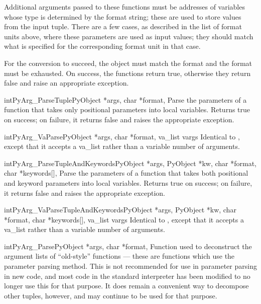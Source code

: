 Additional arguments passed to these functions must be addresses of
variables whose type is determined by the format string; these are
used to store values from the input tuple.  There are a few cases, as
described in the list of format units above, where these parameters
are used as input values; they should match what is specified for the
corresponding format unit in that case.

For the conversion to succeed, the  object must match the
format and the format must be exhausted.  On success, the
 functions return true, otherwise they
return false and raise an appropriate exception.

\begin{cfuncdesc}{int}{PyArg_ParseTuple}{PyObject *args, char *format,
                                         \moreargs}
  Parse the parameters of a function that takes only positional
  parameters into local variables.  Returns true on success; on
  failure, it returns false and raises the appropriate exception.
\end{cfuncdesc}

\begin{cfuncdesc}{int}{PyArg_VaParse}{PyObject *args, char *format,
                                         va_list vargs}
  Identical to , except that it accepts a
  va_list rather than a variable number of arguments.
\end{cfuncdesc}

\begin{cfuncdesc}{int}{PyArg_ParseTupleAndKeywords}{PyObject *args,
                       PyObject *kw, char *format, char *keywords[],
                       \moreargs}
  Parse the parameters of a function that takes both positional and
  keyword parameters into local variables.  Returns true on success;
  on failure, it returns false and raises the appropriate exception.
\end{cfuncdesc}

\begin{cfuncdesc}{int}{PyArg_VaParseTupleAndKeywords}{PyObject *args,
                       PyObject *kw, char *format, char *keywords[],
                       va_list vargs}
  Identical to , except that it
  accepts a va_list rather than a variable number of arguments.
\end{cfuncdesc}

\begin{cfuncdesc}{int}{PyArg_Parse}{PyObject *args, char *format,
                                    \moreargs}
  Function used to deconstruct the argument lists of ``old-style''
  functions --- these are functions which use the
   parameter parsing method.  This is not
  recommended for use in parameter parsing in new code, and most code
  in the standard interpreter has been modified to no longer use this
  for that purpose.  It does remain a convenient way to decompose
  other tuples, however, and may continue to be used for that
  purpose.
\end{cfuncdesc}

